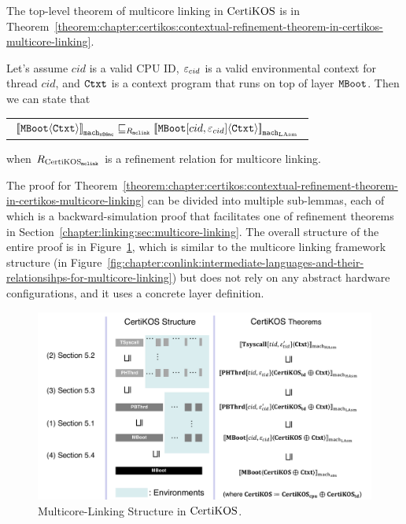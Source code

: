 The top-level theorem of
multicore linking in $\mathrm{CertiKOS}$  is in Theorem~\ref{theorem:chapter:certikos:contextual-refinement-theorem-in-certikos-multicore-linking}.
\begin{theorem}
\label{theorem:chapter:certikos:contextual-refinement-theorem-in-certikos-multicore-linking}
Let's assume  $cid$ is a valid CPU ID, ${\varepsilon}_{cid}$ is a valid
environmental context for thread $cid$, and ${\mathrm{\texttt{Ctxt}}}$ is a
 context program that runs on top of layer ${\mathrm{\texttt{MBoot}}}$. 
 Then we can state that
 \begin{center}
\begin{tabular}{c}
${[\![{{\mathrm{\texttt{MBoot}}}} \langle {{\mathrm{\texttt{Ctxt}}}} \rangle]\!]}_{{\mathrm{\texttt{mach}}}_{{\mathrm{\texttt{x86mc}}}}} \sqsubseteq_{R_{{\mathrm{\texttt{mclink}}}}} {[\![{{\mathrm{\texttt{MBoot}}}[cid, {\varepsilon}_{cid}]} \langle {{\mathrm{\texttt{Ctxt}}}} \rangle]\!]}_{{{\mathrm{\texttt{mach}}}_{\mathrm{LAsm}}}}$\\
\end{tabular}
\end{center}
when ${R_{\mathrm{CertiKOS}_{\mathrm{\texttt{mclink}}}}}$ is a refinement relation for multicore linking.
\end{theorem}


The proof for Theorem~\ref{theorem:chapter:certikos:contextual-refinement-theorem-in-certikos-multicore-linking} 
can be divided into multiple sub-lemmas, each of which is a backward-simulation proof 
that facilitates one of refinement theorems in Section~\ref{chapter:linking:sec:multicore-linking}. 
The overall structure of the entire proof is in Figure~\ref{fig:chapter:certikos:multicore-connect-proof-overall-structure}, which is 
similar to the multicore linking framework structure (in Figure~\ref{fig:chapter:conlink:intermediate-languages-and-their-relationsihps-for-multicore-linking}) but does not rely on
any abstract hardware configurations, and it uses a concrete layer definition. 
 
\begin{figure}
\includegraphics[width=\textwidth, page=2]{figs/certikos/concurrent_linking}
\caption{Multicore-Linking Structure in $\mathrm{CertiKOS}$.}
\label{fig:chapter:certikos:multicore-connect-proof-overall-structure}
\end{figure}


